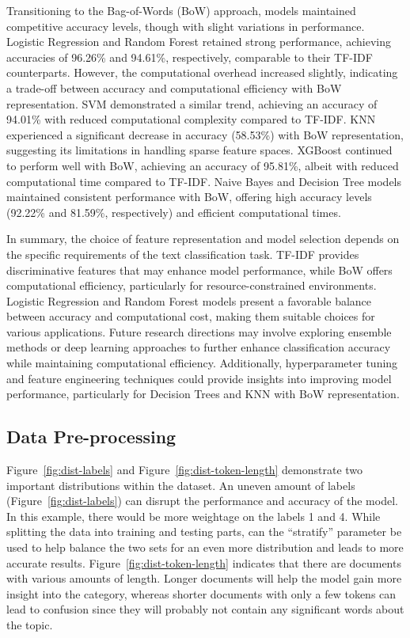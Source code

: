 Transitioning to the Bag-of-Words (BoW) approach, models maintained competitive accuracy levels, though with slight variations in performance. Logistic Regression and Random Forest retained strong performance, achieving accuracies of 96.26\% and 94.61\%, respectively, comparable to their TF-IDF counterparts. However, the computational overhead increased slightly, indicating a trade-off between accuracy and computational efficiency with BoW representation. SVM demonstrated a similar trend, achieving an accuracy of 94.01\% with reduced computational complexity compared to TF-IDF. KNN experienced a significant decrease in accuracy (58.53\%) with BoW representation, suggesting its limitations in handling sparse feature spaces. XGBoost continued to perform well with BoW, achieving an accuracy of 95.81\%, albeit with reduced computational time compared to TF-IDF. Naive Bayes and Decision Tree models maintained consistent performance with BoW, offering high accuracy levels (92.22\% and 81.59\%, respectively) and efficient computational times.

In summary, the choice of feature representation and model selection depends on the specific requirements of the text classification task. TF-IDF provides discriminative features that may enhance model performance, while BoW offers computational efficiency, particularly for resource-constrained environments. Logistic Regression and Random Forest models present a favorable balance between accuracy and computational cost, making them suitable choices for various applications. Future research directions may involve exploring ensemble methods or deep learning approaches to further enhance classification accuracy while maintaining computational efficiency. Additionally, hyperparameter tuning and feature engineering techniques could provide insights into improving model performance, particularly for Decision Trees and KNN with BoW representation.

\subsection{Data Pre-processing}

Figure~\ref{fig:dist-labels} and Figure~\ref{fig:dist-token-length} demonstrate two important distributions within the dataset. An uneven amount of labels (Figure~\ref{fig:dist-labels}) can disrupt the performance and accuracy of the model. In this example, there would be more weightage on the labels 1 and 4. While splitting the data into training and testing parts, can the “stratify” parameter be used to help balance the two sets for an even more distribution and leads to more accurate results. Figure~\ref{fig:dist-token-length} indicates that there are documents with various amounts of length. Longer documents will help the model gain more insight into the category, whereas shorter documents with only a few tokens can lead to confusion since they will probably not contain any significant words about the topic.

